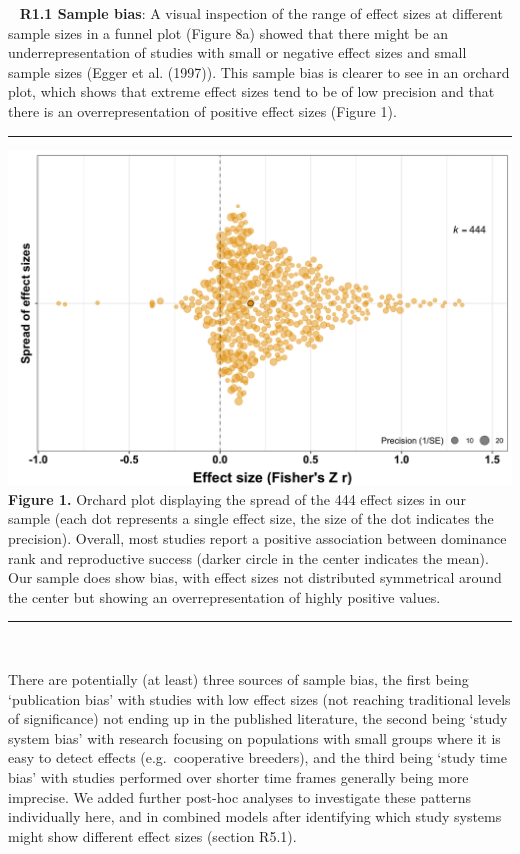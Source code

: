 \documentclass[
]{article}
\begin{document}
~ \textbf{R1.1 Sample bias}: A visual inspection of the range of effect
sizes at different sample sizes in a funnel plot (Figure 8a) showed that
there might be an underrepresentation of studies with small or negative
effect sizes and small sample sizes (Egger et al. (1997)). This sample
bias is clearer to see in an orchard plot, which shows that extreme
effect sizes tend to be of low precision and that there is an
overrepresentation of positive effect sizes (Figure 1).

\begin{center}\rule{0.5\linewidth}{0.5pt}\end{center}

\includegraphics{ranksuccess_Fig1_orchard.png} \textbf{Figure 1.}
Orchard plot displaying the spread of the 444 effect sizes in our sample
(each dot represents a single effect size, the size of the dot indicates
the precision). Overall, most studies report a positive association
between dominance rank and reproductive success (darker circle in the
center indicates the mean). Our sample does show bias, with effect sizes
not distributed symmetrical around the center but showing an
overrepresentation of highly positive values.

\begin{center}\rule{0.5\linewidth}{0.5pt}\end{center}

~

There are potentially (at least) three sources of sample bias, the first
being `publication bias' with studies with low effect sizes (not
reaching traditional levels of significance) not ending up in the
published literature, the second being `study system bias' with research
focusing on populations with small groups where it is easy to detect
effects (e.g.~cooperative breeders), and the third being `study time
bias' with studies performed over shorter time frames generally being
more imprecise. We added further post-hoc analyses to investigate these
patterns individually here, and in combined models after identifying
which study systems might show different effect sizes (section R5.1).
\end{document}

